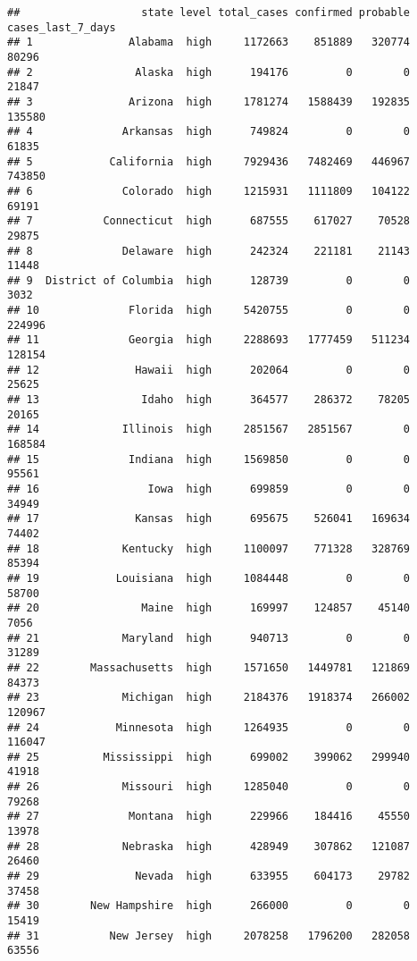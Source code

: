 \documentclass[
]{article}
\begin{document}
\begin{verbatim}
##                   state level total_cases confirmed probable cases_last_7_days
## 1               Alabama  high     1172663    851889   320774             80296
## 2                Alaska  high      194176         0        0             21847
## 3               Arizona  high     1781274   1588439   192835            135580
## 4              Arkansas  high      749824         0        0             61835
## 5            California  high     7929436   7482469   446967            743850
## 6              Colorado  high     1215931   1111809   104122             69191
## 7           Connecticut  high      687555    617027    70528             29875
## 8              Delaware  high      242324    221181    21143             11448
## 9  District of Columbia  high      128739         0        0              3032
## 10              Florida  high     5420755         0        0            224996
## 11              Georgia  high     2288693   1777459   511234            128154
## 12               Hawaii  high      202064         0        0             25625
## 13                Idaho  high      364577    286372    78205             20165
## 14             Illinois  high     2851567   2851567        0            168584
## 15              Indiana  high     1569850         0        0             95561
## 16                 Iowa  high      699859         0        0             34949
## 17               Kansas  high      695675    526041   169634             74402
## 18             Kentucky  high     1100097    771328   328769             85394
## 19            Louisiana  high     1084448         0        0             58700
## 20                Maine  high      169997    124857    45140              7056
## 21             Maryland  high      940713         0        0             31289
## 22        Massachusetts  high     1571650   1449781   121869             84373
## 23             Michigan  high     2184376   1918374   266002            120967
## 24            Minnesota  high     1264935         0        0            116047
## 25          Mississippi  high      699002    399062   299940             41918
## 26             Missouri  high     1285040         0        0             79268
## 27              Montana  high      229966    184416    45550             13978
## 28             Nebraska  high      428949    307862   121087             26460
## 29               Nevada  high      633955    604173    29782             37458
## 30        New Hampshire  high      266000         0        0             15419
## 31           New Jersey  high     2078258   1796200   282058             63556

\end{verbatim}
\end{document}
